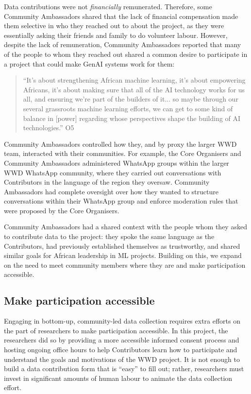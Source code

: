 Data contributions were not \textit{financially} remunerated. Therefore, some Community Ambassadors shared that the lack of financial compensation made them selective in who they reached out to about the project, as they were essentially asking their friends and family to do volunteer labour. However, despite the lack of remuneration, Community Ambassadors reported that many of the people to whom they reached out shared a common desire to participate in a project that could make GenAI systems work for them:
\begin{quote}
    ``It's about strengthening African machine learning, it's about empowering Africans, it's about making sure that all of the AI technology works for us all, and ensuring we're part of the builders of it... so maybe through our several grassroots machine learning efforts, we can get to some kind of balance in [power] regarding whose perspectives shape the building of AI technologies.'' O5
\end{quote}

Community Ambassadors controlled how they, and by proxy the larger \textsc{WWD} team, interacted with their communities. For example, the Core Organisers and Community Ambassadors administered WhatsApp groups within the larger \textsc{WWD} WhatsApp community, where they carried out conversations with Contributors in the language of the region they oversaw. Community Ambassadors had complete oversight over how they wanted to structure conversations within their WhatsApp group and enforce moderation rules that were proposed by the Core Organisers. 

Community Ambassadors had a shared context with the people whom they asked to contribute data to the project: they spoke the same language as the Contributors, had previously established themselves as trustworthy, and shared similar goals for African leadership in ML projects. Building on this, we expand on the need to meet community members where they are and make participation accessible.

\subsection{Make participation accessible}

Engaging in bottom-up, community-led data collection requires extra efforts on the part of researchers to make participation accessible. In this project, the researchers did so by providing a more accessible informed consent process and hosting ongoing office hours to help Contributors learn how to participate and understand the goals and motivations of the \textsc{WWD} project. It is not enough to build a data contribution form that is ``easy'' to fill out; rather, researchers must invest in significant amounts of human labour to animate the data collection effort. 

